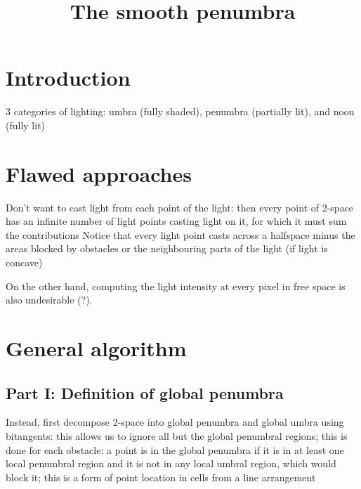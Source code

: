\title{The smooth penumbra}

			
\section{Introduction}

3 categories of lighting: umbra (fully shaded), penumbra (partially lit), 
	and noon (fully lit)

			
\section{Flawed approaches}

Don't want to cast light from each point of the light: 
	then every point of 2-space
	has an infinite number of light points casting light on it,
	for which it must sum the contributions
	Notice that every light point casts across a halfspace minus the
	areas blocked by obstacles or the neighbouring parts of the light (if
	light is concave)
	
On the other hand, computing the light intensity at every pixel
	in free space is also undesirable (?).
	
			
\section{General algorithm}

\subsection{Part I: Definition of global penumbra}

Instead, first decompose 2-space into global penumbra and global umbra using bitangents:
	this allows us to ignore all but the global penumbral regions;
	this is done for each obstacle: a point is in the global penumbra
	if it is in at least one local penumbral region and it is not in any
	local umbral region, which would block it;
	this is a form of point location in cells from a line arrangement
			
